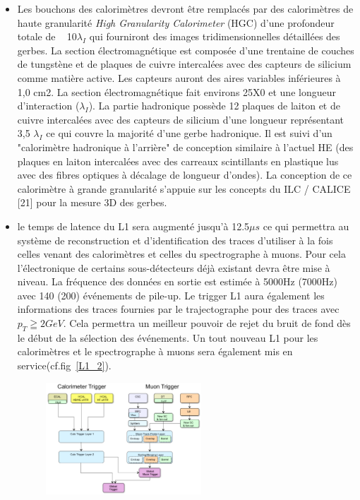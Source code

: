 \begin{itemize}[label=$\bullet$]
	\item Les bouchons des calorimètres devront être remplacés par des calorimètres de haute granularité \textit{High Granularity Calorimeter} (HGC) d'une profondeur totale de ~ 10$\lambda_{I}$ qui fourniront des images tridimensionnelles détaillées des gerbes. La section électromagnétique est composée d'une trentaine de couches de tungstène et de plaques de cuivre intercalées avec des capteurs de silicium comme matière active. Les capteurs auront des aires variables inférieures à ~ 1,0 cm2. La section électromagnétique fait environs 25X0 et une longueur d'interaction ($\lambda_{I}$). La partie hadronique possède 12 plaques de laiton et de cuivre intercalées avec des capteurs de silicium d'une longueur représentant 3,5 $\lambda_{I}$ ce qui couvre la majorité d'une gerbe hadronique. Il est suivi d'un "calorimètre hadronique à l'arrière" de conception similaire à l'actuel HE (des plaques en laiton intercalées avec des carreaux scintillants en plastique lus avec des fibres optiques à décalage de longueur d'ondes). La conception de ce calorimètre à grande granularité s'appuie sur les concepts du ILC / CALICE [21] pour la mesure 3D des gerbes.
	\item le temps de latence du L1 sera augmenté jusqu'à 12.5$\mu s$ ce qui permettra au système de reconstruction et d'identification des traces d'utiliser à la fois celles venant des calorimètres et celles du spectrographe à muons. Pour cela l'électronique de certains sous-détecteurs déjà existant devra être mise à niveau. La fréquence des données en sortie est estimée à 5000Hz (7000Hz) avec 140 (200) événements de pile-up. Le trigger L1 aura également les informations des traces fournies par le trajectographe pour des traces avec $p_{T}\geqq2	GeV$. Cela permettra un meilleur pouvoir de rejet du bruit de fond dès le début de la sélection des événements. Un tout nouveau L1 pour les calorimètres et le spectrographe à muons sera également mis en service(cf.fig~\ref{L1_2}).
	\begin{figure}[ht!]
		\centering
		\includegraphics[width=0.55\textwidth]{CMS/L1_2.png}

\end{figure}
\end{itemize}
